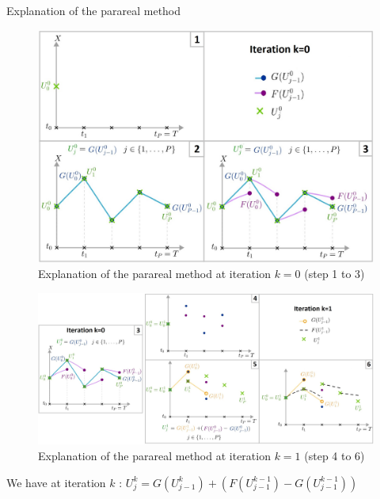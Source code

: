\begin{frame}[allowframebreaks]{Explanation of the parareal method}
	\begin{figure}
		\centering
		\includegraphics[width=0.6\linewidth]{images/parareal/parareal_k0.jpg}
		\caption{Explanation of the parareal method at iteration $k=0$ (step 1 to 3)}
	\end{figure}
	\begin{figure}
		\centering
		\includegraphics[width=0.9\linewidth]{images/parareal/parareal_k1.jpg}
		\caption{Explanation of the parareal method at iteration $k=1$ (step 4 to 6)}
	\end{figure}
	\small
	We have at iteration $k$ : \qquad	$U_j^k=G(U_{j-1}^k)+(F(U_{j-1}^{k-1})-G(U_{j-1}^{k-1}))$
\end{frame}

